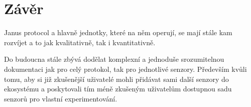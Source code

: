 \newpage
\chapter*{Závěr}

Janus protocol a hlavně jednotky, které na něm operují, se mají stále kam rozvíjet a to jak kvalitativně, tak i kvantitativně.

Do budoucna stále zbývá dodělat komplexní a jednoduše srozumitelnou dokumentaci jak pro celý protokol, tak pro jednotlivé senzory.
Především kvůli tomu, aby si již zkušenější uživatelé mohli přidávat sami další senzory do ekosystému a poskytovali tím méně zkušeným uživatelům dostupnou sadu senzorů pro vlastní experimentování.
